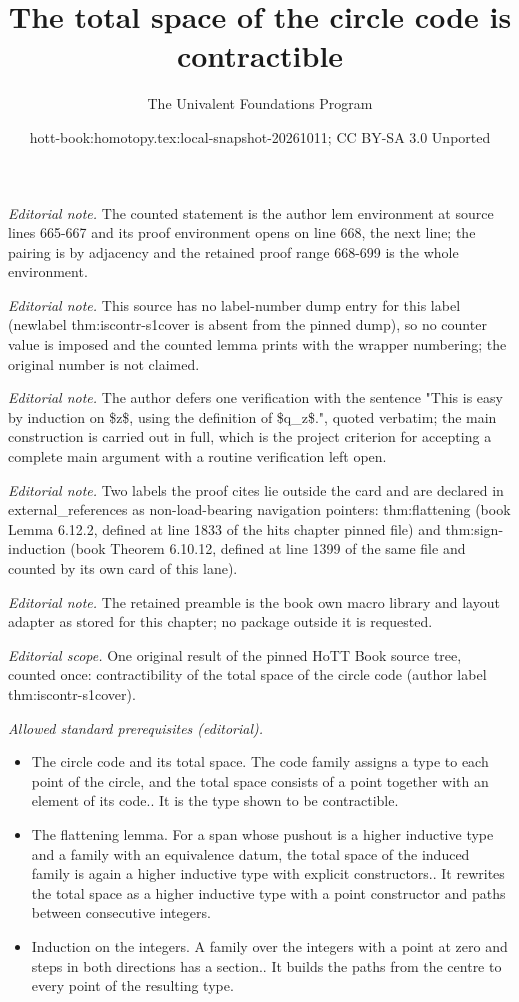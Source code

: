 \documentclass[10pt,a4paper]{article}
\title{The total space of the circle code is contractible}
\author{The Univalent Foundations Program}
\date{hott-book:homotopy.tex:local-snapshot-20261011; CC BY-SA 3.0 Unported}
\newcounter{chapter}
\theoremstyle{definition}
\theoremstyle{remark}
\numberwithin{equation}{section}
\begin{document}
\maketitle
\noindent\textit{Editorial note.} The counted statement is the author lem environment at source lines 665-667 and its proof environment opens on line 668, the next line; the pairing is by adjacency and the retained proof range 668-699 is the whole environment.\par\medskip
\noindent\textit{Editorial note.} This source has no label-number dump entry for this label (newlabel thm:iscontr-s1cover is absent from the pinned dump), so no counter value is imposed and the counted lemma prints with the wrapper numbering; the original number is not claimed.\par\medskip
\noindent\textit{Editorial note.} The author defers one verification with the sentence "This is easy by induction on \$z\$, using the definition of \$q\_z\$.", quoted verbatim; the main construction is carried out in full, which is the project criterion for accepting a complete main argument with a routine verification left open.\par\medskip
\noindent\textit{Editorial note.} Two labels the proof cites lie outside the card and are declared in external\_references as non-load-bearing navigation pointers: thm:flattening (book Lemma 6.12.2, defined at line 1833 of the hits chapter pinned file) and thm:sign-induction (book Theorem 6.10.12, defined at line 1399 of the same file and counted by its own card of this lane).\par\medskip
\noindent\textit{Editorial note.} The retained preamble is the book own macro library and layout adapter as stored for this chapter; no package outside it is requested.\par\medskip
\noindent\textit{Editorial scope.} One original result of the pinned HoTT Book source tree, counted once: contractibility of the total space of the circle code (author label thm:iscontr-s1cover).\par\medskip
\noindent\textit{Allowed standard prerequisites (editorial).}\begin{itemize}
\item The circle code and its total space. The code family assigns a type to each point of the circle, and the total space consists of a point together with an element of its code.. It is the type shown to be contractible.
\item The flattening lemma. For a span whose pushout is a higher inductive type and a family with an equivalence datum, the total space of the induced family is again a higher inductive type with explicit constructors.. It rewrites the total space as a higher inductive type with a point constructor and paths between consecutive integers.
\item Induction on the integers. A family over the integers with a point at zero and steps in both directions has a section.. It builds the paths from the centre to every point of the resulting type.
\end{itemize}\medskip
\end{document}
